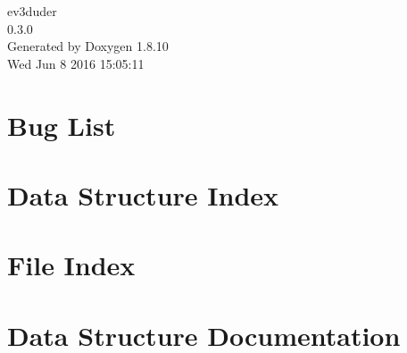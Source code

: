 \documentclass[twoside]{book}
\newcommand{\+}{\discretionary{\mbox{\scriptsize$\hookleftarrow$}}{}{}}
\newcommand{\clearemptydoublepage}{%
  \newpage{\pagestyle{empty}\cleardoublepage}%
}
\begin{document}
\hypersetup{pageanchor=false,
             bookmarks=true,
             bookmarksnumbered=true,
             pdfencoding=unicode
            }
\begin{titlepage}
\vspace*{7cm}
\begin{center}%
{\Large ev3duder \\[1ex]\large 0.\+3.\+0 }\\
\vspace*{1cm}
{\large Generated by Doxygen 1.8.10}\\
\vspace*{0.5cm}
{\small Wed Jun 8 2016 15:05:11}\\
\end{center}
\end{titlepage}
\clearemptydoublepage
\tableofcontents
\clearemptydoublepage
{}
\hypersetup{pageanchor=true}

\chapter{Bug List}
\label{bug}
\hypertarget{bug}{}

\chapter{Data Structure Index}

\chapter{File Index}

\chapter{Data Structure Documentation}



















\end{document}
